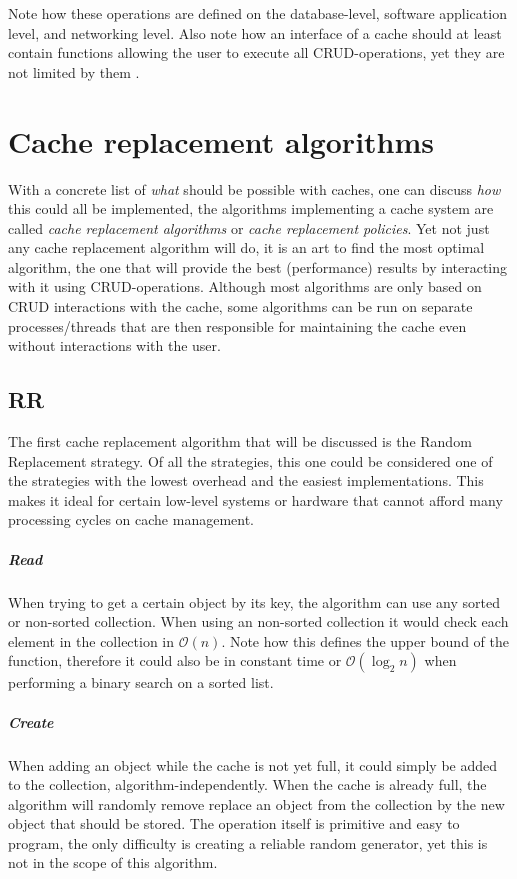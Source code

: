 \documentclass[pdftex,a4paper,12pt,twoside]{report}
\begin{document}
Note how these operations are defined on the database-level, software application level, and networking level. Also note how an interface of a cache should at least contain functions allowing the user to execute all CRUD-operations, yet they are not limited by them \citep{battle2008bridging}.
\chapter{Cache replacement algorithms}
\label{chap:caching_algorithms}
With a concrete list of \emph{what} should be possible with caches, one can discuss \emph{how} this could all be implemented, the algorithms implementing a cache system are called \emph{cache replacement algorithms} or \emph{cache replacement policies}. Yet not just any cache replacement algorithm will do, it is an art to find the most optimal algorithm, the one that will provide the best (performance) results by interacting with it using CRUD-operations.
Although most algorithms are only based on CRUD interactions with the cache, some algorithms can be run on separate processes/threads that are
then responsible for maintaining the cache even without interactions with the user.
\section{RR}
The first cache replacement algorithm that will be discussed is the Random Replacement strategy. Of all the strategies, this one could be considered one of the strategies with the lowest overhead and the easiest implementations. This makes it ideal for certain low-level systems or hardware that cannot afford many processing cycles on cache management.
\paragraph{Read} When trying to get a certain object by its key, the algorithm can use any sorted or non-sorted collection. When using an non-sorted collection it would check each element in the collection in $\mathcal{O}(n)$. Note how this defines the upper bound of the function, therefore it could also be in constant time or $\mathcal{O}(\log_2n)$ when performing a binary search on a sorted list.
\paragraph{Create} When adding an object while the cache is not yet full, it could simply be added to the collection, algorithm-independently. When the cache is already full, the algorithm will randomly remove replace an object from the collection by the new object that should be stored. The operation itself is primitive and easy to program, the only difficulty is creating a reliable random generator, yet this is not in the scope of this algorithm.
\end{document}
